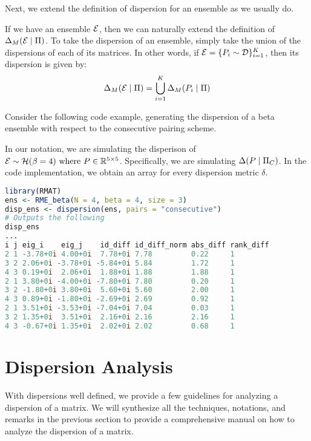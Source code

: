 Next, we extend the definition of dispersion for an ensemble as we usually do.

\begin{definition}
If we have an ensemble $\mathcal{E}$, then we can naturally extend the definition of $\Delta_M(\mathcal{E} \mid \Pi)$.
To take the dispersion of an ensemble, simply take the union of the dispersions of each of its matrices.
In other words, if $\mathcal{E} = \{P_i \sim \mathcal{D}\}_{i = 1}^K$, then its dispersion is given by:
$$\Delta_M(\mathcal{E} \mid \Pi) = \bigcup_{i=1}^K \Delta_M(P_i \mid \Pi)$$
\end{definition}

Consider the following code example, generating the dispersion of a beta ensemble with respect to the consecutive pairing scheme.

\begin{code}
In our notation, we are simulating the disperison of $\mathcal{E} \sim \mathcal{H}(\beta = 4) \text{ where } P \in \mathbb{R}^{5 \times 5}$.
Specifically, we are simulating $\Delta(P \mid \Pi_C)$. In the code implementation, we obtain an array for every dispersion metric $\delta$.
\end{code}
\begin{lstlisting}[language=R]
library(RMAT)
ens <- RME_beta(N = 4, beta = 4, size = 3)
disp_ens <- dispersion(ens, pairs = "consecutive")
# Outputs the following
disp_ens
...
i j eig_i    eig_j    id_diff id_diff_norm abs_diff rank_diff
2 1 -3.78+0i 4.00+0i  7.78+0i 7.78         0.22     1
3 2 2.06+0i -3.78+0i -5.84+0i 5.84         1.72     1
4 3 0.19+0i  2.06+0i  1.88+0i 1.88         1.88     1
2 1 3.80+0i -4.00+0i -7.80+0i 7.80         0.20     1
3 2 -1.80+0i 3.80+0i  5.60+0i 5.60         2.00     1
4 3 0.89+0i -1.80+0i -2.69+0i 2.69         0.92     1
2 1 3.51+0i -3.53+0i -7.04+0i 7.04         0.03     1
3 2 1.35+0i  3.51+0i  2.16+0i 2.16         2.16     1
4 3 -0.67+0i 1.35+0i  2.02+0i 2.02         0.68     1
\end{lstlisting}


\section{Dispersion Analysis}

With dispersions well defined, we provide a few guidelines for analyzing a dispersion of a matrix.
We will synthesize all the techniques, notations, and remarks in the previous section to provide a comprehensive manual on how to analyze the dispersion of a matrix.


